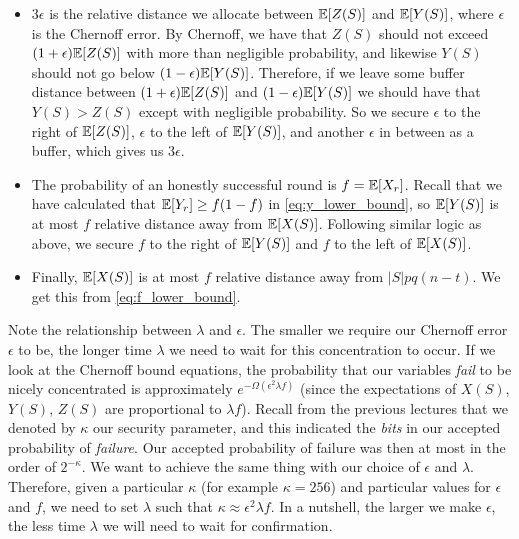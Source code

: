 \begin{itemize}
    \item $3 \epsilon$ is the relative distance we allocate between $\mathbb{E}[Z(S)]$ and $\mathbb{E}[Y(S)]$, where $\epsilon$ is the Chernoff error. By Chernoff, we have that $Z(S)$ should not exceed $(1+\epsilon)\mathbb{E}[Z(S)]$ with more than negligible probability, and likewise $Y(S)$ should not go below $(1-\epsilon)\mathbb{E}[Y(S)]$. Therefore, if we leave some buffer distance between $(1+\epsilon)\mathbb{E}[Z(S)]$ and $(1-\epsilon)\mathbb{E}[Y(S)]$ we should have that $Y(S) > Z(S)$ except with negligible probability. So we secure $\epsilon$ to the right of $\mathbb{E}[Z(S)]$, $\epsilon$ to the left of $\mathbb{E}[Y(S)]$, and another $\epsilon$ in between as a buffer, which gives us $3 \epsilon$.

    \item The probability of an honestly successful round is $f=\mathbb{E}[X_r]$. Recall that we have calculated that $\mathbb{E}[Y_r] \geq f (1-f)$ in \eqref{eq:y_lower_bound}, so $\mathbb{E}[Y(S)]$ is at most $f$ relative distance away from $\mathbb{E}[X(S)]$. Following similar logic as above, we secure $f$ to the right of $\mathbb{E}[Y(S)]$ and $f$ to the left of $\mathbb{E}[X(S)]$.

    \item Finally, $\mathbb{E}[X(S)]$ is at most $f$ relative distance away from $|S|pq(n-t)$. We get this from \eqref{eq:f_lower_bound}.

\end{itemize}

Note the relationship between $\lambda$ and $\epsilon$. The smaller we require our Chernoff error $\epsilon$ to be, the longer time $\lambda$ we need to wait for this concentration to occur. If we look at the Chernoff bound equations, the probability that our variables \emph{fail} to be nicely concentrated is approximately $e^{-\Omega(\epsilon^2 \lambda f)}$ (since the expectations of $X(S)$, $Y(S)$, $Z(S)$ are proportional to $\lambda f$). Recall from the previous lectures that we denoted by $\kappa$ our security parameter, and this indicated the \emph{bits} in our accepted probability of \emph{failure}. Our accepted probability of failure was then at most in the order of $2^{-\kappa}$. We want to achieve the same thing with our choice of $\epsilon$ and $\lambda$. Therefore, given a particular $\kappa$ (for example $\kappa = 256$) and particular values for $\epsilon$ and $f$, we need to set $\lambda$ such that $\kappa \approx \epsilon^2 \lambda f$. In a nutshell, the larger we make $\epsilon$, the less time $\lambda$ we will need to wait for confirmation.

